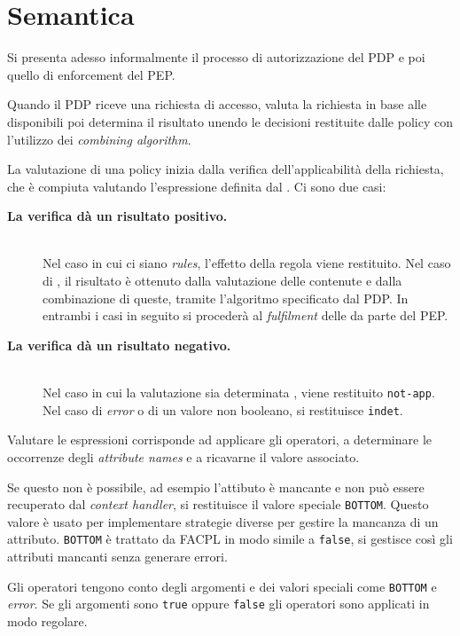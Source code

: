 \section{Semantica}
\label{sec:sem_fpl}
Si presenta adesso informalmente il processo di autorizzazione del \ac{PDP} e poi quello di enforcement del \ac{PEP}.\par
Quando il \ac{PDP} riceve una richiesta di accesso, valuta la richiesta in base alle \epolicy disponibili poi determina
il risultato unendo le decisioni restituite dalle policy con l'utilizzo dei \emph{combining algorithm}.\par
La valutazione di una policy inizia dalla verifica dell'applicabilità della richiesta, che è compiuta valutando
l'espressione definita dal \etarget. Ci sono due casi:
\begin{description}
  \item[\normalfont\bfseries{\MakeUppercase{L}a verifica dà un risultato positivo.}] \hfill \\
        Nel caso in cui ci siano \emph{rules}, l'effetto della regola viene restituito.
        Nel caso di \ePolicySet, il risultato è ottenuto dalla valutazione delle \epolicy contenute e dalla combinazione di queste,
        tramite l'algoritmo specificato dal \ac{PDP}. In entrambi i casi in seguito si procederà al \emph{fulfilment} delle
        \eobligation da parte del \ac{PEP}.
  \item[\normalfont\bfseries{\MakeUppercase{L}a verifica dà un risultato negativo.}] \hfill \\
        Nel caso in cui la valutazione sia determinata \efalse, viene restituito
        \texttt{not-app}. Nel caso di \emph{error} o di un valore non booleano, si restituisce \texttt{indet}.
\end{description}
Valutare le espressioni corrisponde ad applicare gli operatori, a determinare le occorrenze degli \emph{attribute names} e
a ricavarne il valore associato.\par
Se questo non è possibile, ad esempio l'attibuto è mancante e non può essere recuperato dal \emph{context handler}, si
restituisce il valore speciale \texttt{BOTTOM}. Questo valore è usato per implementare strategie diverse per gestire
la mancanza di un attributo. \texttt{BOTTOM} è trattato da \ac{FACPL} in modo simile a \texttt{false}, si gestisce
così gli attributi mancanti senza generare errori.\par
Gli operatori tengono conto degli argomenti e dei valori speciali come \texttt{BOTTOM} e \emph{error}.
Se gli argomenti sono \texttt{true} oppure \texttt{false} gli operatori sono applicati in modo regolare.
